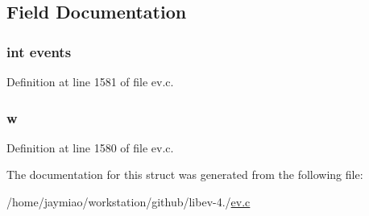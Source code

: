 \subsection{\-Field \-Documentation}
\hypertarget{struct_a_n_p_e_n_d_i_n_g_a81a8a3a775bf2b769ce2a0f687a44c9f}{
\subsubsection[{events}]{\setlength{\rightskip}{0pt plus 5cm}int {\bf events}}}\label{struct_a_n_p_e_n_d_i_n_g_a81a8a3a775bf2b769ce2a0f687a44c9f}


\-Definition at line 1581 of file ev.\-c.

\hypertarget{struct_a_n_p_e_n_d_i_n_g_aa2a9fd41c12285551bc8b6554950bd61}{
\subsubsection[{w}]{ {\bf w}}}\label{struct_a_n_p_e_n_d_i_n_g_aa2a9fd41c12285551bc8b6554950bd61}


\-Definition at line 1580 of file ev.\-c.



\-The documentation for this struct was generated from the following file\-:\begin{DoxyCompactItemize}
\item 
/home/jaymiao/workstation/github/libev-\/4./\hyperlink{ev_8c}{ev.\-c}\end{DoxyCompactItemize}
